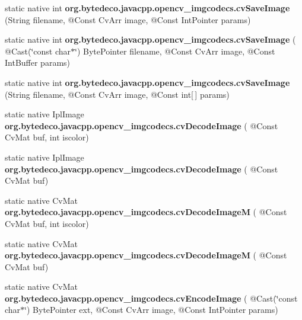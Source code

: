 \begin{DoxyCompactItemize}
static native int {\bfseries org.\+bytedeco.\+javacpp.\+opencv\+\_\+imgcodecs.\+cv\+Save\+Image} (String filename, @Const Cv\+Arr image, @Const Int\+Pointer params)
\item 
\mbox{\label{group__imgcodecs__c_gaca0f8f5703bbbfb8656200dfc43ffe6b}} 
static native int {\bfseries org.\+bytedeco.\+javacpp.\+opencv\+\_\+imgcodecs.\+cv\+Save\+Image} ( @Cast(\char`\"{}const char$\ast$\char`\"{}) Byte\+Pointer filename, @Const Cv\+Arr image, @Const Int\+Buffer params)
\item 
\mbox{\label{group__imgcodecs__c_gad3c7b745e95ceef25210da6b42a841cc}} 
static native int {\bfseries org.\+bytedeco.\+javacpp.\+opencv\+\_\+imgcodecs.\+cv\+Save\+Image} (String filename, @Const Cv\+Arr image, @Const int\mbox{[}$\,$\mbox{]} params)
\item 
\mbox{\label{group__imgcodecs__c_ga83fa0e4fcef60ba1b94e7c909195b732}} 
static native Ipl\+Image {\bfseries org.\+bytedeco.\+javacpp.\+opencv\+\_\+imgcodecs.\+cv\+Decode\+Image} ( @Const Cv\+Mat buf, int iscolor)
\item 
\mbox{\label{group__imgcodecs__c_gaf941be1758583f870ff2ae587c20035e}} 
static native Ipl\+Image {\bfseries org.\+bytedeco.\+javacpp.\+opencv\+\_\+imgcodecs.\+cv\+Decode\+Image} ( @Const Cv\+Mat buf)
\item 
\mbox{\label{group__imgcodecs__c_ga5857e3083e13c8a74f53f49d86388c19}} 
static native Cv\+Mat {\bfseries org.\+bytedeco.\+javacpp.\+opencv\+\_\+imgcodecs.\+cv\+Decode\+ImageM} ( @Const Cv\+Mat buf, int iscolor)
\item 
\mbox{\label{group__imgcodecs__c_gafbefbcff60ebcf3a3b3b50bee6a4c8ed}} 
static native Cv\+Mat {\bfseries org.\+bytedeco.\+javacpp.\+opencv\+\_\+imgcodecs.\+cv\+Decode\+ImageM} ( @Const Cv\+Mat buf)
\item 
\mbox{\label{group__imgcodecs__c_ga57224bf84773224cdd8cff1558e0a872}} 
static native Cv\+Mat {\bfseries org.\+bytedeco.\+javacpp.\+opencv\+\_\+imgcodecs.\+cv\+Encode\+Image} ( @Cast(\char`\"{}const char$\ast$\char`\"{}) Byte\+Pointer ext, @Const Cv\+Arr image, @Const Int\+Pointer params)

\end{DoxyCompactItemize}
